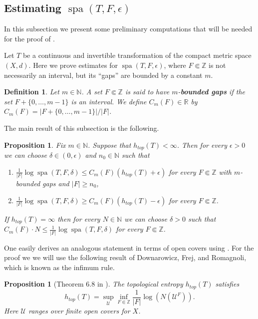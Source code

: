 \documentclass[a4paper,oneside]{amsart}
\renewcommand{\(}{\begin{dmath*}}
\renewcommand{\)}{\end{dmath*}}
\newtheorem{proposition}[theorem]{Proposition}
\newtheorem{definition}[theorem]{Definition}
\theoremstyle{definition}
\newcommand{\N}{\mathbb{N}}
\newcommand{\R}{\mathbb{R}}
\newcommand{\Z}{\mathbb{Z}}
\newcommand{\U}{\mathcal{U}}
\newcommand{\spa}{\operatorname{spa}}
\begin{document}
\subsection{Estimating  $\spa(T,F,\epsilon)$}\label{sec:estimates}
In this subsection we present some preliminary computations that will be needed for the proof of .

Let $T$ be a continuous and invertible transformation of the compact metric space $(X,d)$. Here we prove estimates for $\spa(T,F,\epsilon)$, where $F\Subset \Z$ is not necessarily an interval, but its ``gaps'' are bounded by a constant $m$. 

\begin{definition}\label{constant-C_m} Let $m\in\N$. A set $F\Subset \Z$ is said to have $m$-\textbf{bounded gaps} if the set $F+\{0,\dots,m-1\}$ is an interval. We define $C_m(F)\in\R $ by $
C_m(F)=|F+\{0,\dots,m-1\}|/|F|$.
\end{definition} The main result of this subsection is the following.
\begin{proposition}\label{estimate}
Fix $m\in\N$. Suppose that $h_{top}(T)<\infty$. Then for every  $\epsilon>0$ we can choose $\delta\in (0,\epsilon)$ and $n_0\in\N$ such that
\begin{enumerate}
    \item $\frac{1}{|F|}\log \spa(T,F,\delta)\leq C_m(F) (h_{top}(T)+\epsilon)$ for every $F\Subset\Z$ with $m$-bounded gaps and $|F|\geq n_0$,
    \item $
    \frac{1}{|F|}\log \spa(T,F,\delta)\geq C_m(F) (h_{top}(T)-\epsilon)$ for every $F\Subset\Z$.
\end{enumerate}
    If $h_{top}(T)=\infty$ then for every $N\in\N$ we can choose $\delta>0$ such that $C_m(F)\cdot N\leq \frac{1}{|F|}\log \spa(T,F,\delta)$ for every $F\Subset\Z$.
\end{proposition} 
One easily derives an analogous statement in terms of open covers using . For the proof we we will use the following result of Downarowicz, Frej, and  Romagnoli, which is known as the infimum rule. 
\begin{proposition}[Theorem 6.8 in \cite{kolyada_shearers_2016}]\label{downarowicz}
The topological entropy $h_{top}(T)$ satisfies
\[\label{eq:downarowicz}
        h_{top}(T)=\sup_{\mathcal U}\inf_{F\Subset \Z}\frac{1}{|F|}\log(N(\mathcal{U}^F)).
\]
    Here $\U$ ranges over finite open covers for $X$.
\end{proposition}
\end{document}

